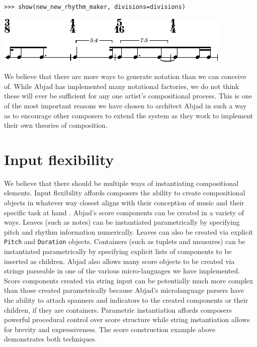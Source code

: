 \documentclass{article}
\begin{document}

\begin{lstlisting}
>>> show(new_new_rhythm_maker, divisions=divisions)
\end{lstlisting}
\includegraphics{assets/lilypond-23e2752f7db7cf02e31cf8e9f399c5b6.pdf}


\noindent We believe that there are more ways to generate notation than we can conceive
of. While Abjad has implemented many notational factories, we do not think
these will ever be sufficient for any one artist's compositional process. This is one of the most important reasons we have chosen to architect Abjad in such a way as to encourage other composers to extend the system as they work to implement their own theories of composition.



\section{Input flexibility}

We believe that there should be multiple ways of instantiating compositional
elements. Input flexibility affords composers the ability to create
compositional objects in whatever way closest aligns with their conception of
music and their specific task at hand \cite{Kay:1996vn}. Abjad's score
components can be created in a variety of ways. Leaves (such as notes) can be
instantiated parametrically by specifying pitch and rhythm information
numerically. Leaves can also be created via explicit \texttt{Pitch} and
\texttt{Duration} objects. Containers (such as tuplets and measures) can be
instantiated parametrically by specifying explicit lists of components to be
inserted as children. Abjad also allows many score objects to be created via
strings parseable in one of the various micro-languages we have implemented.
Score components created via string input can be potentially much more complex
than those created parametrically because Abjad's microlanguage parsers have
the ability to attach spanners and indicators to the created components or
their children, if they are containers. Parametric instantiation affords
composers powerful procedural control over score structure while string
instantiation allows for brevity and expressiveness. The score construction
example above demonstrates both techniques.
\end{document}
